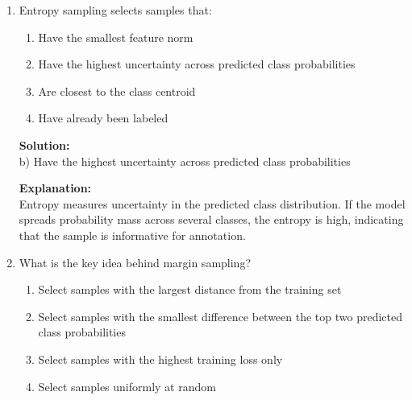 \documentclass{article}
\begin{document}
\begin{enumerate}
\begin{enumerate}
    \item It measures how much GPU memory is used during retraining
    \item It summarizes how efficiently performance improves as more labels are acquired
    \item It counts the number of oracle queries only
    \item It replaces all other evaluation metrics
\end{enumerate}

\textbf{Solution:} \\
b) It summarizes how efficiently performance improves as more labels are acquired

\textbf{Explanation:} \\
In active learning, we care not only about final performance but also about how quickly the model improves with additional labeled samples. A higher AUC indicates a more label-efficient acquisition strategy.

\vspace{1em}

\item Entropy sampling selects samples that:

\begin{enumerate}
    \item Have the smallest feature norm
    \item Have the highest uncertainty across predicted class probabilities
    \item Are closest to the class centroid
    \item Have already been labeled
\end{enumerate}

\textbf{Solution:} \\
b) Have the highest uncertainty across predicted class probabilities

\textbf{Explanation:} \\
Entropy measures uncertainty in the predicted class distribution. If the model spreads probability mass across several classes, the entropy is high, indicating that the sample is informative for annotation.

\vspace{1em}

\item What is the key idea behind margin sampling?

\begin{enumerate}
    \item Select samples with the largest distance from the training set
    \item Select samples with the smallest difference between the top two predicted class probabilities
    \item Select samples with the highest training loss only
    \item Select samples uniformly at random
\end{enumerate}


\end{enumerate}
\end{document}
